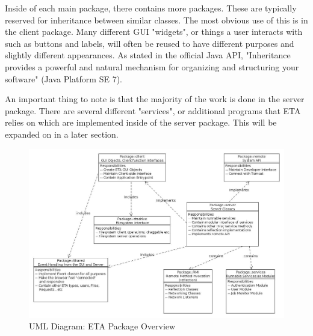 \documentclass[a4paper,12pt]{texMemo}
\begin{document}
Inside of each main package, there contains more packages. These are typically reserved for inheritance between similar classes. The most obvious use of this is in the client package. Many different GUI "widgets", or things a user interacts with such as buttons and labels, will often be reused to have different purposes and slightly different appearances. As stated in the official Java API, "Inheritance provides a powerful and natural mechanism for organizing and structuring your software" (Java Platform SE 7).

An important thing to note is that the majority of the work is done in the server package. There are several different "services", or additional programs that ETA relies on which are implemented inside of the server package. This will be expanded on in a later section.
\begin{figure}
\includegraphics[width=1\textwidth]{ETAPackageOverview.jpg}
\caption{UML Diagram: ETA Package Overview}
\label{fig:ETAPackageOverview}

\end{figure}
\newpage
\end{document}
